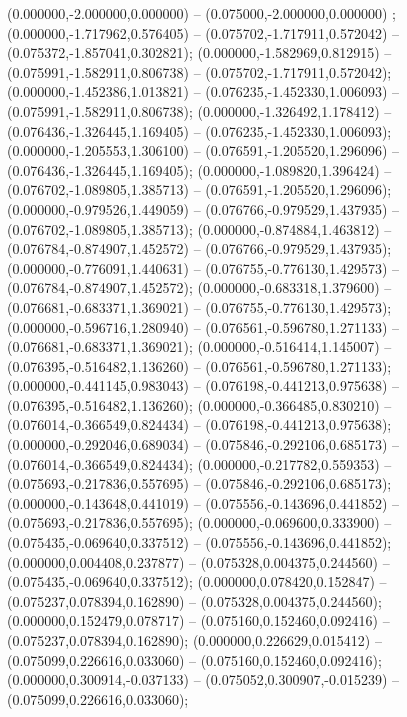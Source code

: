  (0.000000,-2.000000,0.000000) -- (0.075000,-2.000000,0.000000) ;
 (0.000000,-1.717962,0.576405) -- (0.075702,-1.717911,0.572042) -- (0.075372,-1.857041,0.302821);
 (0.000000,-1.582969,0.812915) -- (0.075991,-1.582911,0.806738) -- (0.075702,-1.717911,0.572042);
 (0.000000,-1.452386,1.013821) -- (0.076235,-1.452330,1.006093) -- (0.075991,-1.582911,0.806738);
 (0.000000,-1.326492,1.178412) -- (0.076436,-1.326445,1.169405) -- (0.076235,-1.452330,1.006093);
 (0.000000,-1.205553,1.306100) -- (0.076591,-1.205520,1.296096) -- (0.076436,-1.326445,1.169405);
 (0.000000,-1.089820,1.396424) -- (0.076702,-1.089805,1.385713) -- (0.076591,-1.205520,1.296096);
 (0.000000,-0.979526,1.449059) -- (0.076766,-0.979529,1.437935) -- (0.076702,-1.089805,1.385713);
 (0.000000,-0.874884,1.463812) -- (0.076784,-0.874907,1.452572) -- (0.076766,-0.979529,1.437935);
 (0.000000,-0.776091,1.440631) -- (0.076755,-0.776130,1.429573) -- (0.076784,-0.874907,1.452572);
 (0.000000,-0.683318,1.379600) -- (0.076681,-0.683371,1.369021) -- (0.076755,-0.776130,1.429573);
 (0.000000,-0.596716,1.280940) -- (0.076561,-0.596780,1.271133) -- (0.076681,-0.683371,1.369021);
 (0.000000,-0.516414,1.145007) -- (0.076395,-0.516482,1.136260) -- (0.076561,-0.596780,1.271133);
 (0.000000,-0.441145,0.983043) -- (0.076198,-0.441213,0.975638) -- (0.076395,-0.516482,1.136260);
 (0.000000,-0.366485,0.830210) -- (0.076014,-0.366549,0.824434) -- (0.076198,-0.441213,0.975638);
 (0.000000,-0.292046,0.689034) -- (0.075846,-0.292106,0.685173) -- (0.076014,-0.366549,0.824434);
 (0.000000,-0.217782,0.559353) -- (0.075693,-0.217836,0.557695) -- (0.075846,-0.292106,0.685173);
 (0.000000,-0.143648,0.441019) -- (0.075556,-0.143696,0.441852) -- (0.075693,-0.217836,0.557695);
 (0.000000,-0.069600,0.333900) -- (0.075435,-0.069640,0.337512) -- (0.075556,-0.143696,0.441852);
 (0.000000,0.004408,0.237877) -- (0.075328,0.004375,0.244560) -- (0.075435,-0.069640,0.337512);
 (0.000000,0.078420,0.152847) -- (0.075237,0.078394,0.162890) -- (0.075328,0.004375,0.244560);
 (0.000000,0.152479,0.078717) -- (0.075160,0.152460,0.092416) -- (0.075237,0.078394,0.162890);
 (0.000000,0.226629,0.015412) -- (0.075099,0.226616,0.033060) -- (0.075160,0.152460,0.092416);
 (0.000000,0.300914,-0.037133) -- (0.075052,0.300907,-0.015239) -- (0.075099,0.226616,0.033060);
